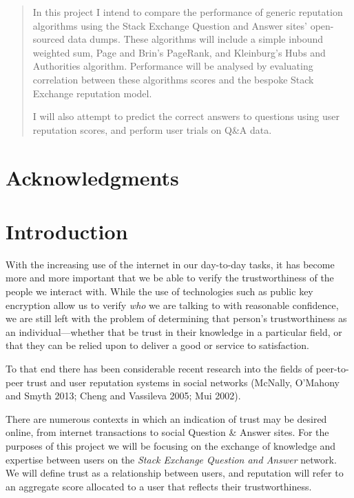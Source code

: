 \documentclass[]{final_report}
\begin{document}
\begin{abstract}

In this project I intend to compare the performance of generic reputation algorithms using the Stack Exchange Question and Answer sites' open-sourced data dumps. These algorithms will include a simple inbound weighted sum, Page and Brin's PageRank, and Kleinburg's Hubs and Authorities algorithm. Performance will be analysed by evaluating correlation between these algorithms scores and the bespoke Stack Exchange reputation model.

I will also attempt to predict the correct answers to questions using user reputation scores, and perform user trials on Q\&A data.

\end{abstract}
\newpage

\chapter*{Acknowledgments}


\chapter{Introduction}

With the increasing use of the internet in our day-to-day tasks, it has become more and more important that we be able to verify the trustworthiness of the people we interact with. While the use of technologies such as public key encryption allow us to verify \textsl{who} we are talking to with reasonable confidence, we are still left with the problem of determining that person's trustworthiness as an individual---whether that be trust in their knowledge in a particular field, or that they can be relied upon to deliver a good or service to satisfaction.

To that end there has been considerable recent research into the fields of peer-to-peer trust and user reputation systems in social networks (McNally, O'Mahony and Smyth 2013; Cheng and Vassileva 2005; Mui 2002).

There are numerous contexts in which an indication of trust may be desired online, from internet transactions to social Question \& Answer sites. For the purposes of this project we will be focusing on the exchange of knowledge and expertise between users on the \textsl{Stack Exchange Question and Answer} network. We will define trust as a relationship between users, and reputation will refer to an aggregate score allocated to a user that reflects their trustworthiness.
\end{document}
